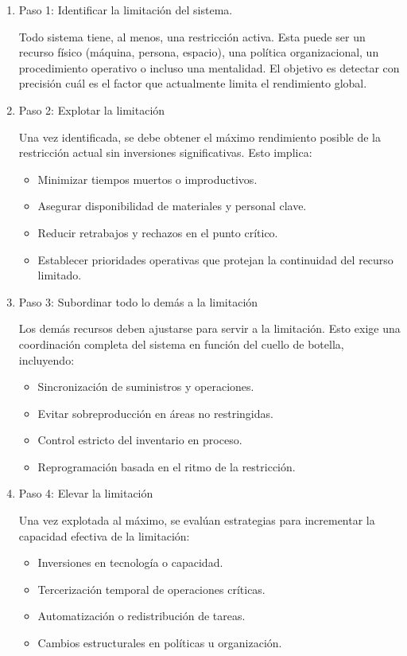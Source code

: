 \documentclass[a4paper,oneside,11pt]{article}
\begin{document}
\begin{enumerate}
    \item Paso 1: Identificar la limitación del sistema.

    Todo sistema tiene, al menos, una restricción activa. Esta puede ser un recurso físico (máquina, persona, espacio), una política organizacional, un procedimiento operativo o incluso una mentalidad. El objetivo es detectar con precisión cuál es el factor que actualmente limita el rendimiento global.

    \item Paso 2: Explotar la limitación

    Una vez identificada, se debe obtener el máximo rendimiento posible de la restricción actual sin inversiones significativas. Esto implica:
    \begin{itemize}
        \item Minimizar tiempos muertos o improductivos.
        \item Asegurar disponibilidad de materiales y personal clave.
        \item Reducir retrabajos y rechazos en el punto crítico.
        \item Establecer prioridades operativas que protejan la continuidad del recurso limitado.
    \end{itemize}

    \item Paso 3: Subordinar todo lo demás a la limitación

    Los demás recursos deben ajustarse para servir a la limitación. Esto exige una coordinación completa del sistema en función del cuello de botella, incluyendo:

    \begin{itemize}
        \item Sincronización de suministros y operaciones.
        \item Evitar sobreproducción en áreas no restringidas.
        \item Control estricto del inventario en proceso.
        \item Reprogramación basada en el ritmo de la restricción.
    \end{itemize}

    \item Paso 4: Elevar la limitación

    Una vez explotada al máximo, se evalúan estrategias para incrementar la capacidad efectiva de la limitación:

    \begin{itemize}
        \item Inversiones en tecnología o capacidad.
        \item Tercerización temporal de operaciones críticas.
        \item Automatización o redistribución de tareas.
        \item Cambios estructurales en políticas u organización.
    \end{itemize}
    

\end{enumerate}
\end{document}
